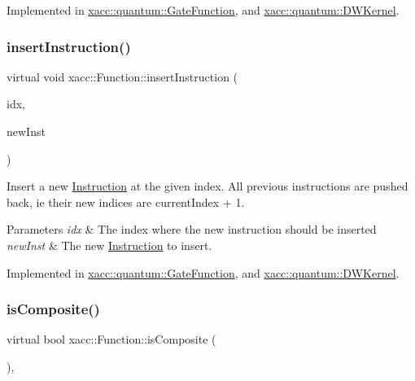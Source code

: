 Implemented in \hyperlink{a01249_aebce6a9e64aed7f4aff86df752bacfe2}{xacc\+::quantum\+::\+Gate\+Function}, and \hyperlink{a01221_abbb8f2b1c78623c377524e45d581d018}{xacc\+::quantum\+::\+D\+W\+Kernel}.

\mbox{\label{a01653_acde702e44bdbc2759b338365218d7ebe}} 
\subsubsection{\texorpdfstring{insert\+Instruction()}{insertInstruction()}}
{\footnotesize\ttfamily virtual void xacc\+::\+Function\+::insert\+Instruction (\begin{DoxyParamCaption}\item[{const int}]{idx,  }\item[{Inst\+Ptr}]{new\+Inst }\end{DoxyParamCaption})\hspace{0.3cm}{\ttfamily [pure virtual]}}

Insert a new \hyperlink{a01657}{Instruction} at the given index. All previous instructions are pushed back, ie their new indices are current\+Index + 1.


\begin{DoxyParams}{Parameters}
{\em idx} & The index where the new instruction should be inserted \\
\hline
{\em new\+Inst} & The new \hyperlink{a01657}{Instruction} to insert. \\
\hline
\end{DoxyParams}


Implemented in \hyperlink{a01249_aed3b963f1c4eb3215ca46af48d78f588}{xacc\+::quantum\+::\+Gate\+Function}, and \hyperlink{a01221_a1627af0141f70fc4a3cd500a13fb31b8}{xacc\+::quantum\+::\+D\+W\+Kernel}.

\mbox{\label{a01653_aa75500c657b5c3e0e36213e1506aad97}} 
\subsubsection{\texorpdfstring{is\+Composite()}{isComposite()}}
{\footnotesize\ttfamily virtual bool xacc\+::\+Function\+::is\+Composite (\begin{DoxyParamCaption}{ }\end{DoxyParamCaption})\hspace{0.3cm}{\ttfamily [inline]}, {\ttfamily [virtual]}}

